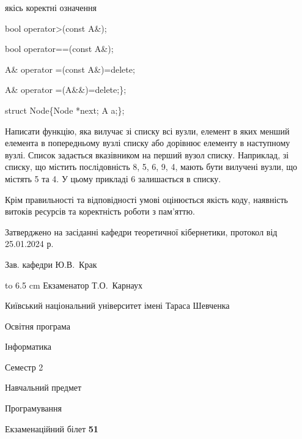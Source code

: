 \documentclass[12pt, ukrainian]{article}
\begin{document}
{\quad  якісь коректні означення 

\quad  bool operator>(const A\&); 

\quad  bool operator==(const A\&); 

\quad A\& operator =(const A\&)=delete; 

\quad  A\& operator =(A\&\&)=delete;\};

struct Node\{Node *next; A a;\};

 Написати функцію, яка вилучає зі списку всі вузли, елемент в яких менший елемента в попередньому вузлі списку або дорівнює елементу в наступному вузлі. Список задається вказівником на перший вузол списку. Наприклад, зі списку, що містить послідовність 8, 5, 6, 9, 4, мають бути вилучені вузли, що містять 5 та 4. У цьому прикладі 6 залишається в списку.

Крім правильності та відповідності умові оцінюється якість коду, наявність витоків ресурсів та коректність роботи з пам'яттю. 

}
{\smallskip\smallskip \begin {scriptsize} Затверджено на засіданні кафедри теоретичної кібернетики, протокол   від   25.01.2024 р.\par\smallskip\smallskip\smallskip\smallskip
{\parbox {6.5 cm} {Зав. кафедри \dotfill Ю.В.~Крак}}\hspace {0.7cm} {\hbox to 6.5 cm { Екзаменатор \dotfill Т.О.~Карнаух}} \end{scriptsize}}
\newpage
{{\begin {scriptsize}\par
{ \center  Київський національний університет імені Тараса Шевченка \par}
{\parbox {5 cm}{Освітня програма \hfill}{\parbox {7 cm}{Інформатика\hfill}}\parbox {6 cm}{\hfill Семестр 2}}\par
{\parbox {5 cm} {Навчальний предмет \hfill}\parbox {7 cm}{Програмування \hfill}\parbox {6cm}{\hfill}\par}\vspace{-15pt} \end{scriptsize}}{\center Екзаменаційний білет \No \textbf { 51 }\par}}
\end{document}
